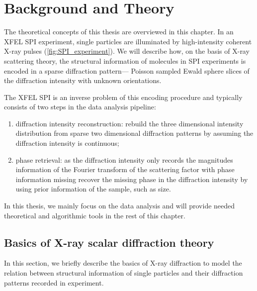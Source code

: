 \chapter{Background and Theory}
\label{ch:background}
The theoretical concepts of this thesis are overviewed in this chapter.
In an XFEL SPI experiment, single particles are illuminated by high-intensity coherent X-ray pulses
(\cref{fig:SPI_experiment}). 
We will describe how, on the basis of X-ray scattering theory, the structural information of molecules in SPI experiments is encoded\cite{lohReconstructionAlgorithmSingleparticle2009} in a sparse diffraction pattern--- Poisson sampled Ewald sphere slices of the
diffraction intensity with unknown orientations.

The XFEL SPI is an inverse problem of this encoding procedure and typically consists of
two steps in the data analysis pipeline: 
\begin{enumerate}
    \item diffraction intensity reconstruction: rebuild the three dimensional
        intensity distribution from sparse two dimensional diffraction patterns by assuming
        the diffraction intensity is continuous;
    \item phase retrieval: as the diffraction intensity only records the magnitudes information of
        the Fourier transform of the scattering factor with phase information missing recover
        the missing phase in the diffraction intensity by using prior information of the sample, such
        as size.
\end{enumerate}
In this thesis, we mainly focus on the data analysis and will provide needed theoretical and algorithmic
tools in the rest of this chapter.


\section{Basics of X-ray scalar diffraction theory}
\label{sec:scattering_diffraction}

In this section, we briefly describe the basics of X-ray diffraction to 
model the relation between structural information of single particles and 
their diffraction patterns recorded in experiment.

